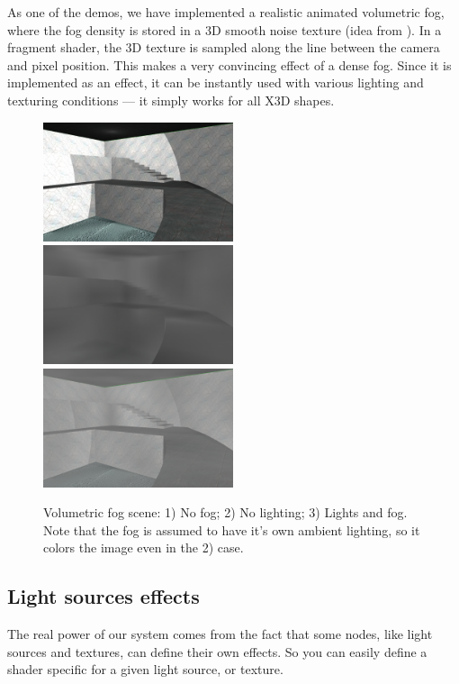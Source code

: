 \documentclass{acmsiggraph}                     %
\begin{document}
As one of the demos, we have implemented a realistic
animated volumetric fog, where the fog density is stored in
a 3D smooth noise texture (idea from \cite{humus:volumetricfog}).
In a fragment shader, the 3D texture is sampled
along the line between the camera and pixel position. This makes a very
convincing effect of a dense fog. Since it is implemented as an effect,
it can be instantly used with various lighting and texturing conditions
--- it simply works for all X3D shapes.

\begin{figure}[t]
  \centering
  \includegraphics[width=2.2in]{volumetric_animated_fog_no_fog}
  \includegraphics[width=2.2in]{volumetric_animated_fog_no_light}
  \includegraphics[width=2.2in]{volumetric_animated_fog_all}
  \caption{Volumetric fog scene: 1) No fog; 2) No lighting; 3) Lights and fog.
Note that the fog is assumed to have it's own ambient lighting,
so it colors the image even in the 2) case.}
\end{figure}

\subsection{Light sources effects}

The real power of our system comes from the fact that some nodes,
like light sources and textures, can define their own effects.
So you can easily define a shader specific for a given light source,
or texture.
\end{document}
